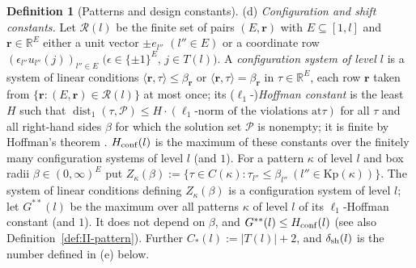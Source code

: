 \documentclass[10pt]{amsart}
\theoremstyle{definition}
\newtheorem{definition}[theorem]{Definition}
\theoremstyle{remark}
\newcommand{\dist}{\operatorname{dist}}
\newcommand{\R}{\mathbb R}
\newcommand{\ip}[2]{\langle #1,#2\rangle}
\begin{document}
\begin{definition}[Patterns and design constants]
\textup{(d)} \emph{Configuration and shift constants.}  Let
$\mathcal R(l)$ be the finite set of pairs $(E,\mathbf r)$ with
$E\subseteq[1,l]$ and $\mathbf r\in\R^E$ either a unit vector $\pm e_{l''}$
$(l''\in E)$ or a coordinate row $(\epsilon_{l''}u_{l''}(j))_{l''\in E}$
$(\epsilon\in\{\pm1\}^E$, $j\in T(l))$.  A \emph{configuration system of
level $l$} is a system of linear conditions $\ip{\mathbf r}{\tau}\le\beta_{\mathbf r}$
or $\ip{\mathbf r}{\tau}=\beta_{\mathbf r}$ in $\tau\in\R^E$, each row $\mathbf r$
taken from $\{\mathbf r:(E,\mathbf r)\in\mathcal R(l)\}$ at most once; its
($\ell_1$-)\emph{Hoffman constant} is the least $H$ such that
$\dist_1(\tau,\mathcal P)\le H\cdot(\text{$\ell_1$-norm of the violations at
$\tau$})$ for all $\tau$ and all right-hand sides $\beta$ for which the
solution set $\mathcal P$ is nonempty; it is finite by Hoffman's theorem
\cite{Hoffman}.  $H_{\rm conf}(l)$ is the maximum of these constants over
the finitely many configuration systems of level $l$ (and $1$).
For a pattern $\kappa$ of level $l$ and box radii $\beta\in(0,\infty)^E$ put
$Z_\kappa(\beta):=\{\tau\in C(\kappa):\tau_{l''}\le\beta_{l''}\
(l''\in\mathrm{Kp}(\kappa))\}$.  The system of linear conditions defining
$Z_\kappa(\beta)$ is a configuration system of level $l$; let $G^{**}(l)$ be
the maximum over all patterns $\kappa$ of level $l$ of its
$\ell_1$-Hoffman constant (and $1$).  It does not depend on $\beta$, and
$G^{**}(l)\le H_{\rm conf}(l)$ (see also Definition~\ref{def:II-pattern}).
Further $C_*(l):=|T(l)|+2$, and $\delta_{\rm sh}(l)$ is the number defined
in \textup{(e)} below.


\end{definition}
\end{document}
